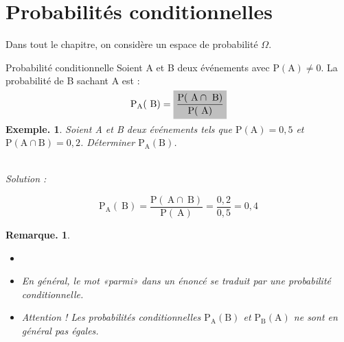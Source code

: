 \documentclass[12pt]{article}
\title{
  \vspace{4em}
  \centering
  \tcbset{colframe=BlackSav,colback=GrayBG}
  \tcbox[tikznode]{
    Chapitre 10 \\Probabilités conditionnelles
  }
}
\author{}
\date{}
\theoremstyle{break}
\newtheorem*{example}{Exemple.}
\newtheorem*{remark}{Remarque.}
\begin{document}
\maketitle

\tableofcontents

\newcommand{\hideM}[1]{\mbox{\vphantom{$#1$}\smash{\colorbox{gray!50}{$\displaystyle #1$}}} }
\newcommand{\hide}[1]{\mbox{\vphantom{#1}\smash{\colorbox{gray!50}{#1}}}}

\newpage
\section{Probabilités conditionnelles}
Dans tout le chapitre, on considère un espace de probabilité $\Omega$.

\begin{definition}{Probabilité conditionnelle}{}
Soient A et B deux événements avec $\mathrm{P}(\mathrm{A}) \neq 0$. La probabilité de B sachant A est :

$$
\mathrm{P}_{\mathrm{A}}(\mathrm{~B})=\hideM{\frac{\mathrm{P}(\mathrm{~A} \cap \mathrm{~B})}{\mathrm{P}(\mathrm{~A})}}
$$
\end{definition}

\begin{example}
Soient A et B deux événements tels que $\mathrm{P}(\mathrm{A})=0,5$ et $\mathrm{P}(\mathrm{A} \cap \mathrm{B})=0,2$. Déterminer $\mathrm{P}_{\mathrm{A}}(\mathrm{B})$.

~\\Solution :

$$
\mathrm{P}_{\mathrm{A}}(\mathrm{~B})=\frac{\mathrm{P}(\mathrm{~A} \cap \mathrm{~B})}{\mathrm{P}(\mathrm{~A})}=\frac{0,2}{0,5}=0,4
$$
\end{example}

\begin{remark}
\begin{itemize}
  \item[]
  \item En général, le mot «parmi» dans un énoncé se traduit par une probabilité conditionnelle.
  \item Attention ! Les probabilités conditionnelles $\mathrm{P}_{\mathrm{A}}(\mathrm{B})$ et $\mathrm{P}_{\mathrm{B}}(\mathrm{A})$ ne sont en général pas égales.
\end{itemize}
\end{remark}
\end{document}
